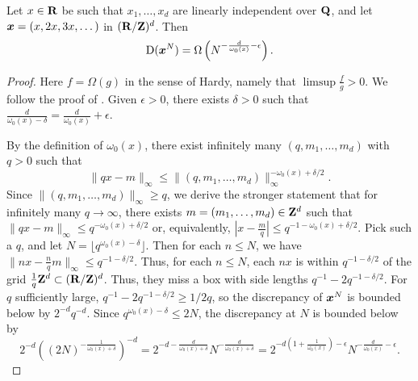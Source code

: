 \begin{theorem}
Let $x\in \mathbf{R}$ be such that $x_1,\dots,x_d$ are linearly independent over 
$\mathbf{Q}$, and let ${\boldsymbol x}=(x,2x,3x,\dots)$ in $(\mathbf{R}/\mathbf{Z})^d$. Then 
\[
	\operatorname{D}({\boldsymbol x}^N) = \Omega\left(N^{-\frac{d}{\omega_0(x)}-\epsilon} \right).
\]
\end{theorem}
\begin{proof}
Here $f=\Omega(g)$ in the sense of Hardy, namely that $\limsup \frac f g>0$. We 
follow the proof of \cite[Ch.~2, Th.~3.3]{kuipers-niederreiter-1974}. Given 
$\epsilon>0$, there exists $\delta>0$ such that 
$\frac{d}{\omega_0(x)-\delta} = \frac{d}{\omega_0(x)} + \epsilon$. 

By the definition of $\omega_0(x)$, there exist infinitely many 
$(q,m_1,\dots,m_d)$ with $q>0$ such that 
\[
	\|q x - m\|_\infty \leqslant \|(q,m_1,\dots,m_d)\|_\infty^{-\omega_0(x)+\delta/2} .
\]
Since $\|(q,m_1,\dots,m_d)\|_\infty \geqslant q$, we derive the stronger 
statement that for infinitely many $q\to \infty$, there exists 
$m=(m_1,\dots,m_d)\in \mathbf{Z}^d$ such that 
$\|q x-m\|_\infty \leqslant q^{-\omega_0(x)+\delta/2}$ or, equivalently, 
$|x-\frac m q| \leqslant q^{-1-\omega_0(x)+\delta/2}$. Pick such a $q$, and let 
$N=\lfloor q^{\omega_0(x)-\delta}\rfloor$. Then for each $n\leqslant N$, we 
have $\|n x - \frac n q m\|_\infty \leqslant q^{-1-\delta/2}$. Thus, for each 
$n\leqslant N$, each $n x$ is within $q^{-1-\delta/2}$ of the grid 
$\frac 1 q \mathbf{Z}^d\subset (\mathbf{R}/\mathbf{Z})^d$. Thus, they miss a box with side lengths 
$q^{-1} - 2 q^{-1-\delta/2}$. For $q$ sufficiently large, 
$q^{-1} - 2 q^{-1-\delta/2} \geqslant 1/2q$, so the discrepancy of ${\boldsymbol x}^N$ is 
bounded below by $2^{-d} q^{-d}$. Since $q^{\omega_0(x)-\delta} \leqslant 2 N$, 
the discrepancy at $N$ is bounded below by 
\[
	2^{-d} \left( (2 N)^{-\frac{1}{\omega_0(x)+\delta}}\right)^{-d} 
		= 2^{-d-\frac{d}{\omega_0(x)+\delta}} N^{-\frac{d}{\omega_0(x)+\delta}}
		= 2^{-d\left(1+\frac{1}{\omega_0(x)}\right)-\epsilon} N^{-\frac{d}{\omega_0(x)}-\epsilon} .
\]
\end{proof}

